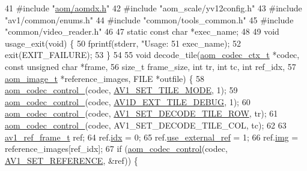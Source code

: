 \begin{DoxyCodeInclude}
41 \textcolor{preprocessor}{#include "\hyperlink{aomdx_8h}{aom/aomdx.h}"}
42 \textcolor{preprocessor}{#include "aom\_scale/yv12config.h"}
43 \textcolor{preprocessor}{#include "av1/common/enums.h"}
44 \textcolor{preprocessor}{#include "common/tools\_common.h"}
45 \textcolor{preprocessor}{#include "common/video\_reader.h"}
46 
47 \textcolor{keyword}{static} \textcolor{keyword}{const} \textcolor{keywordtype}{char} *exec\_name;
48 
49 \textcolor{keywordtype}{void} usage\_exit(\textcolor{keywordtype}{void}) \{
50   fprintf(stderr, \textcolor{stringliteral}{"Usage: %
51           exec\_name);
52   exit(EXIT\_FAILURE);
53 \}
54 
55 \textcolor{keywordtype}{void} decode\_tile(\hyperlink{structaom__codec__ctx}{aom\_codec\_ctx\_t} *codec, \textcolor{keyword}{const} \textcolor{keywordtype}{unsigned} \textcolor{keywordtype}{char} *frame,
56                  \textcolor{keywordtype}{size\_t} frame\_size, \textcolor{keywordtype}{int} tr, \textcolor{keywordtype}{int} tc, \textcolor{keywordtype}{int} ref\_idx,
57                  \hyperlink{structaom__image}{aom\_image\_t} *reference\_images, FILE *outfile) \{
58   \hyperlink{group__codec_ga51eb332a40dcacc39000ab8e0be36b79}{aom\_codec\_control\_}(codec, \hyperlink{group__aom__decoder_gga3865fd4b3192489baa9a5c3632ebe97ba0795d8084ae8c78528c01587198df9e2}{AV1\_SET\_TILE\_MODE}, 1);
59   \hyperlink{group__codec_ga51eb332a40dcacc39000ab8e0be36b79}{aom\_codec\_control\_}(codec, \hyperlink{group__aom__decoder_gga3865fd4b3192489baa9a5c3632ebe97baffdaca91296725bd16142a33f3cc6522}{AV1D\_EXT\_TILE\_DEBUG}, 1);
60   \hyperlink{group__codec_ga51eb332a40dcacc39000ab8e0be36b79}{aom\_codec\_control\_}(codec, \hyperlink{group__aom__decoder_gga3865fd4b3192489baa9a5c3632ebe97bac056b4cf80427fd05e3c4c9fc46edb78}{AV1\_SET\_DECODE\_TILE\_ROW}, tr);
61   \hyperlink{group__codec_ga51eb332a40dcacc39000ab8e0be36b79}{aom\_codec\_control\_}(codec, AV1\_SET\_DECODE\_TILE\_COL, tc);
62 
63   \hyperlink{structav1__ref__frame}{av1\_ref\_frame\_t} ref;
64   ref.\hyperlink{structav1__ref__frame_a7c6fcaba58f514985448cb2e2245345c}{idx} = 0;
65   ref.\hyperlink{structav1__ref__frame_a33749c5c20033cc5f7582d0ec1c34ff0}{use\_external\_ref} = 1;
66   ref.\hyperlink{structav1__ref__frame_a55a09db9e1acdd73e656b01fa01283b3}{img} = reference\_images[ref\_idx];
67   \textcolor{keywordflow}{if} (\hyperlink{group__codec_ga6da974f4eeaba1fa74106b28d0fe6ac5}{aom\_codec\_control}(codec, \hyperlink{group__aom_gga9421a1fa78c0d9587ae5aa6c1cb3d659a51ad4467b4dc318406cceb257e2daa41}{AV1\_SET\_REFERENCE}, &ref)) \{
}
\end{DoxyCodeInclude}
